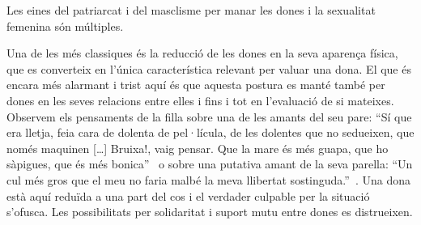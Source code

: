 Les eines del patriarcat i del masclisme per manar les dones i la sexualitat femenina són múltiples.

Una de les més classiques és la reducció de les dones en la seva aparença física, que es converteix en l'única característica relevant per valuar una dona.
El que és encara més alarmant i trist aquí és que aquesta postura es manté també per dones en les seves relacions entre elles i fins i tot en l'evaluació de si mateixes.
Observem els pensaments de la filla sobre una de les amants del seu pare:
``Sí que era lletja, feia cara de dolenta de pel·lícula, de les dolentes que no sedueixen, que només maquinen [\ldots] Bruixa!, vaig pensar. Que la mare és més guapa, que ho sàpigues, que és més bonica''~\autocite[186]{ElHachmi2008}
o sobre una putativa amant de la seva parella:
``Un cul més gros que el meu no faria malbé la meva llibertat sostinguda.''~\autocite[308]{ElHachmi2008}.
Una dona està aquí reduïda a una part del cos i el verdader culpable per la situació s'ofusca.
Les possibilitats per solidaritat i suport mutu entre dones es distrueixen.

